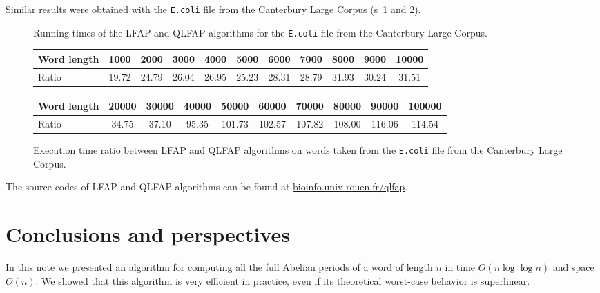 \documentclass[3p]{elsarticle}
\begin{document}
Similar results were obtained with the \texttt{E.coli} file from the Canterbury Large Corpus
 (\figurename s~\ref{fig-expe-ecoli} and \ref{fig-ratio-ecoli}).

\begin{figure}
\caption{
\label{fig-expe-ecoli}
Running times of the LFAP and QLFAP algorithms for
the \texttt{E.coli} file from the Canterbury Large Corpus.
}
\end{figure}

\begin{figure}
\begin{center}
\begin{tabular}{|l|c|c|c|c|c|c|c|c|c|c|}
\hline
Word length & {\small 1000}&{\small 2000}&{\small 3000}&{\small 4000}&{\small 5000}&{\small 6000}&{\small 7000}&{\small 8000}&{\small 9000}&{\small 10000}\\
\hline
Ratio &
19.72 &
24.79&
26.04 &
26.95&
25.23&
28.31 &
28.79 &
31.93&
30.24&
31.51
\\
\hline
\end{tabular}

\begin{tabular}{|l|c|c|c|c|c|c|c|c|c|}
\hline
Word length &
{\small 20000}&{\small 30000}&{\small 40000}&{\small 50000}&{\small 60000}&{\small 70000}&{\small 80000}&{\small 90000}&{\small 100000}\\
\hline
Ratio &
34.75 &
37.10 &
95.35 &
101.73 &
102.57 &
107.82&
108.00&
116.06&
114.54
\\
\hline
\end{tabular}
\end{center}
\caption{\label{fig-ratio-ecoli}Execution time ratio between LFAP and QLFAP algorithms on
 words taken from the \texttt{E.coli} file from the Canterbury Large Corpus.
}
\end{figure}

The source codes of LFAP and QLFAP algorithms can be found at
 \url{bioinfo.univ-rouen.fr/qlfap}.

\section{Conclusions and perspectives}\label{sec-conc}


In this note we presented an algorithm for computing all the full Abelian periods of a word of length $n$ in time $O(n\log\log n)$ and space $O(n)$. We showed that this algorithm is very efficient in practice, even if its theoretical worst-case behavior is superlinear.
\end{document}
